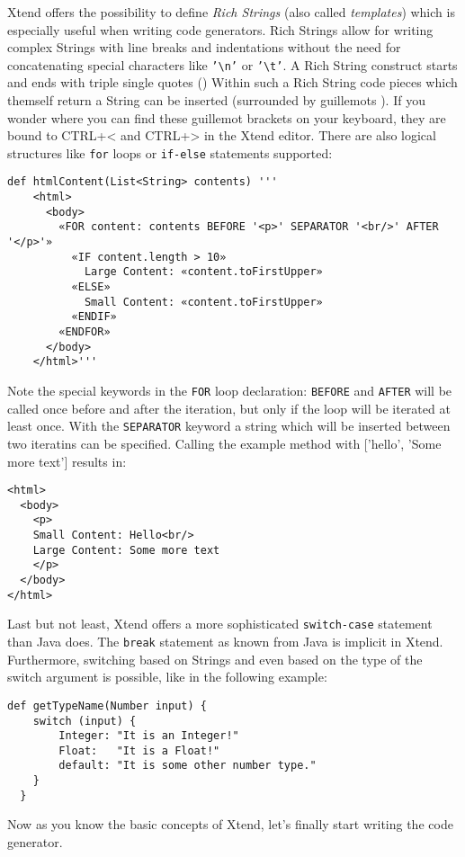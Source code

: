 Xtend offers the possibility to define \emph{Rich Strings} (also called \emph{templates})
which is especially useful when writing code generators. Rich Strings allow for
writing complex Strings with line breaks and indentations without the need for
concatenating special characters like \texttt{'\textbackslash n'} or \texttt{'\textbackslash t'}. A Rich String
construct starts and ends with triple single quotes
(\textquotesingle\textquotesingle\textquotesingle) Within such a Rich String
code pieces which themself return a String can be inserted (surrounded by guillemots
\texttt{\guillemotleft\guillemotright}). If you wonder where you can find these
guillemot brackets on your keyboard, they are bound to CTRL+< and CTRL+> in the
Xtend editor. There are also logical structures like \texttt{for} loops or
\texttt{if-else} statements supported:

\begin{lstlisting}[language=Xtend]
  def htmlContent(List<String> contents) '''
  	<html>
  	  <body>
  	    «FOR content: contents BEFORE '<p>' SEPARATOR '<br/>' AFTER '</p>'»
  	      «IF content.length > 10»
  	        Large Content: «content.toFirstUpper»
  	      «ELSE»
  	        Small Content: «content.toFirstUpper»
  	      «ENDIF»
  	    «ENDFOR»
  	  </body>
  	</html>'''
\end{lstlisting}

Note the special keywords in the \texttt{FOR} loop declaration: \texttt{BEFORE} 
and \texttt{AFTER} will be called once before and after the iteration, but only
if the loop will be iterated at least once. With the \texttt{SEPARATOR} keyword
a string which will be inserted between two iteratins can be specified. Calling 
the example method with ['hello', 'Some more text'] results in:

\begin{lstlisting}[language=Xtend]
<html>
  <body>
    <p>
    Small Content: Hello<br/>
    Large Content: Some more text
    </p>
  </body>
</html>
\end{lstlisting}

Last but not least, Xtend offers a more sophisticated \texttt{switch-case} statement
than Java does. The \texttt{break} statement as known from Java is implicit in Xtend.
Furthermore, switching based on Strings and even based on the type of the switch
argument is possible, like in the following example:

\begin{lstlisting}[language=Xtend]
  def getTypeName(Number input) {
  	switch (input) {
  		Integer: "It is an Integer!"
  		Float:   "It is a Float!"
  		default: "It is some other number type."
  	}
  }
\end{lstlisting}

Now as you know the basic concepts of Xtend, let's finally start writing the code
generator.
